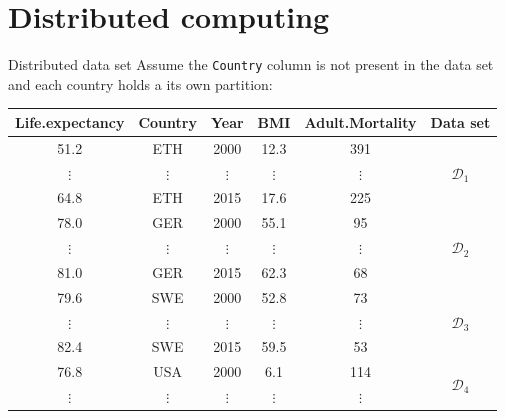 \documentclass[t,10pt]{beamer}
\begin{document}
\section{Distributed computing}

\newcommand{\iSite}{s}
\newcommand{\nSites}{S}
\newcommand{\doH}{\texttt{[H]}\xspace}
\newcommand{\doS}{\texttt{[S]}\xspace}
\newcommand{\algospace}{\hspace{\algorithmicindent}}
\newcommand{\lsite}{\blk_\times}

\begin{frame}{Distributed data set}
  Assume the \texttt{Country} column is not present in the data set and each country holds a its own partition:\vspace{-0.3cm}
  {\tiny
  \begin{table}
  \centering
  \begin{tabular}[t]{cccccc}
  \toprule
    \textbf{Life.expectancy} & {\color{lightgray}\textbf{Country}} & \textbf{Year} & \textbf{BMI} & \textbf{Adult.Mortality} & \textbf{Data set}\\
  \midrule
    51.2 & {\color{lightgray}ETH} & 2000 & 12.3 & 391 & \multirow{3}{*}{\color[HTML]{3B4992}\normalsize$\mathcal{D}_1$}\\
    {\tiny$\vdots$} & {\tiny\color{lightgray}$\vdots$} & {\tiny$\vdots$} & {\tiny$\vdots$} & {\tiny$\vdots$}\\
    64.8 & {\color{lightgray}ETH} & 2015 & 17.6 & 225\\ \hline
    78.0 & {\color{lightgray}GER} & 2000 & 55.1 & 95 & \multirow{3}{*}{\color[HTML]{EE0000}\normalsize$\mathcal{D}_2$}\\
    {\tiny$\vdots$} & {\tiny\color{lightgray}$\vdots$} & {\tiny$\vdots$} & {\tiny$\vdots$} & {\tiny$\vdots$}\\
    81.0 & {\color{lightgray}GER} & 2015 & 62.3 & 68\\ \hline
    79.6 & {\color{lightgray}SWE} & 2000 & 52.8 & 73 & \multirow{3}{*}{\color[HTML]{008B45}\normalsize$\mathcal{D}_3$}\\
    {\tiny$\vdots$} & {\tiny\color{lightgray}$\vdots$} & {\tiny$\vdots$} & {\tiny$\vdots$} & {\tiny$\vdots$}\\
    82.4 & {\color{lightgray}SWE} & 2015 & 59.5 & 53\\ \hline
    76.8 & {\color{lightgray}USA} & 2000 & 6.1  & 114 & \multirow{3}{*}{\color[HTML]{631879}\normalsize$\mathcal{D}_4$}\\
    {\tiny$\vdots$} & {\tiny\color{lightgray}$\vdots$} & {\tiny$\vdots$} & {\tiny$\vdots$} & {\tiny$\vdots$}\\

\end{tabular}
\end{table}}
\end{frame}
\end{document}
